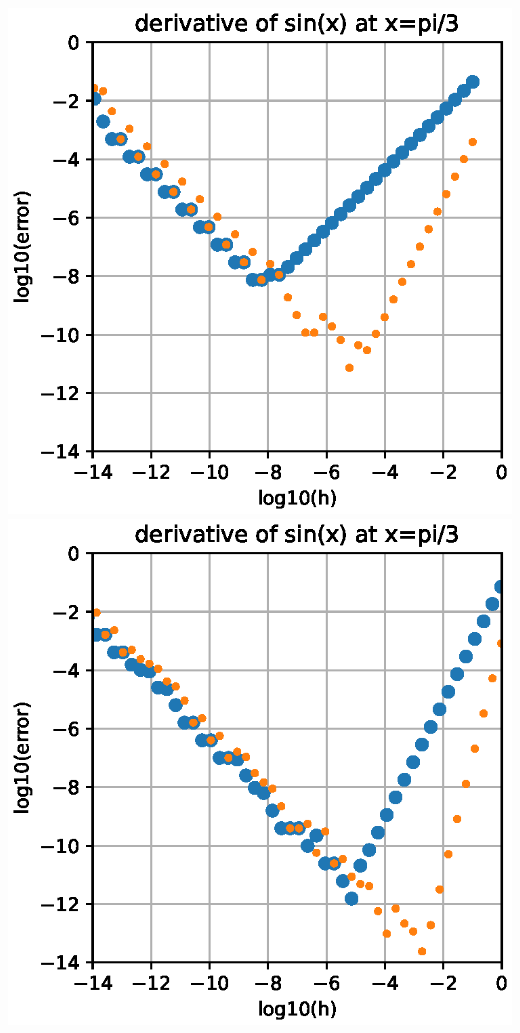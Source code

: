 \documentclass[12pt,letterpaper,noanswers]{exam}
\begin{document}
\includegraphics[width=0.5\linewidth]{img/Class12sinforwardR.eps}
\includegraphics[width=0.5\linewidth]{img/Class12sincentralR.eps}
\end{document}
